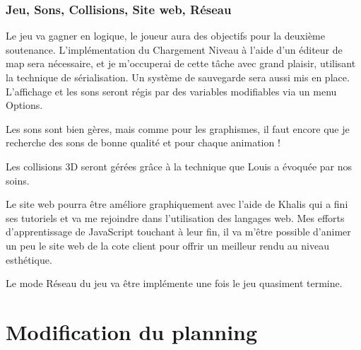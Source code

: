 \documentclass{article}
\begin{document}
\subsubsection {Jeu, Sons, Collisions, Site web, Réseau}

\par
Le jeu va gagner en logique, le joueur aura des objectifs pour la deuxième soutenance. L'implémentation du Chargement Niveau à l'aide d'un éditeur de map sera nécessaire, et je m'occuperai de cette tâche avec grand plaisir, utilisant la technique de sérialisation. Un système de sauvegarde sera aussi mis en place. L'affichage et les sons seront régis par des variables modifiables via un menu Options.

\par
Les sons sont bien gères, mais comme pour les graphismes, il faut encore que je recherche des sons de bonne qualité et pour chaque animation !

\par
Les collisions 3D seront gérées grâce à la technique que Louis a évoquée par nos soins.

\par
Le site web pourra être améliore graphiquement avec l'aide de Khalis qui a fini ses tutoriels et va me rejoindre dans l'utilisation des langages web. Mes efforts d'apprentissage de JavaScript touchant à leur fin, il va m'être possible d'animer un peu le site web de la cote client pour offrir un meilleur rendu au niveau esthétique. 
\par
Le mode Réseau du jeu va être implémente une fois le jeu quasiment termine.

\newpage

\section{Modification du planning}
\end{document}
